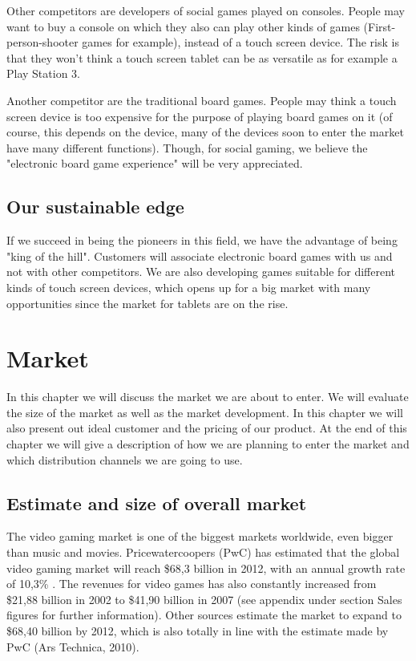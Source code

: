 \documentclass[12pt,a4paper]{article}
\begin{document}
Other competitors are developers of social games played on consoles. People may want to buy a console on which they also can play other kinds of games (First-person-shooter games for example), instead of a touch screen device. The risk is that they won't think a touch screen tablet can be as versatile as for example a Play Station 3.

Another competitor are the traditional board games. People may think a touch screen device is too expensive for the purpose of playing board games on it (of course, this depends on the device, many of the devices soon to enter the market have many different functions). Though, for social gaming, we believe the "electronic board game experience" will be very appreciated.

\subsection{Our sustainable edge}
If we succeed in being the pioneers in this field, we have the advantage of being "king of the hill". Customers will associate electronic board games with us and not with other competitors. We are also developing games suitable for different kinds of touch screen devices, which opens up for a big market with many opportunities since the market for tablets are on the rise.

\section{Market}
In this chapter we will discuss the market we are about to enter. We will evaluate the size of the market as well as the market development. In this chapter we will also present out ideal customer and the pricing of our product. At the end of this chapter we will give a description of how we are planning to enter the market and which distribution channels we are going to use.

\subsection{Estimate and size of overall market}
The video gaming market is one of the biggest markets worldwide, even bigger than music and movies. Pricewatercoopers (PwC) has estimated that the global video gaming market will reach \$68,3 billion in 2012, with an annual growth rate of 10,3\% . The revenues for video games has also constantly increased from \$21,88 billion in 2002 to \$41,90 billion in 2007 (see appendix under section Sales figures for further information). Other sources estimate the market to expand to \$68,40 billion by 2012, which is also totally in line with the estimate made by PwC (Ars Technica, 2010).
\end{document}
